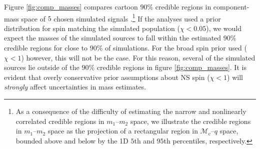 Figure \ref{fig:comp_masses} compares cartoon $90\%$ credible regions in component-mass space of $5$ chosen simulated signals \citep[cf.][figure 1]{Chatziioannou_2014}.\footnote{As a consequence of the difficulty of estimating the narrow and nonlinearly correlated credible regions in $m_1$--$m_2$ space, we illustrate the credible regions in $m_1$--$m_2$ space as the projection of a rectangular region in $\mathcal{M}_\mathrm{c}$--$q$ space, bounded above and below by the 1D $5$th and $95$th percentiles, respectively.} If the analyses used a prior distribution for spin matching the simulated population ($\chi < 0.05$), we would expect the masses of the simulated sources to fall within the estimated $90\%$ credible regions for close to $90\%$ of simulations. For the broad spin prior used ($\chi < 1$) however, this will not be the case.  For this reason, several of the simulated sources lie outside of the $90\%$ credible regions in figure \ref{fig:comp_masses}.  It is evident that overly conservative prior assumptions about NS spin ($\chi < 1$) will \textit{strongly} affect uncertainties in mass estimates.
  
  
  
  
  
  